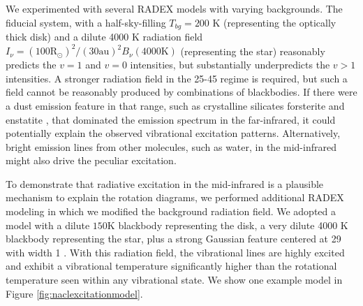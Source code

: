 \documentclass[twocolumn]{aastex62}
\begin{document}
We experimented with several RADEX models with varying backgrounds.  The
fiducial system, with a half-sky-filling $T_{bg}=200$ K (representing the
optically thick disk) and a dilute 4000 K radiation field $I_{\nu} = (100
\mathrm{R_\odot})^2 / (30 \mathrm{au})^2 B_\nu(4000 \mathrm{K})$ (representing
the star) reasonably predicts the $v=1$ and $v=0$ intensities, but
substantially underpredicts the $v>1$ intensities.  A stronger radiation
field in the 25-45 \um regime is required, but such a field cannot be
reasonably produced by combinations of blackbodies.  If there were a dust
emission feature in that range, such as crystalline silicates forsterite
and enstatite \citep[e.g.][]{Molster2005a}, that dominated the emission spectrum
in the far-infrared, it could potentially explain the observed vibrational
excitation patterns.  Alternatively, bright emission lines from other molecules,
such as water, in the mid-infrared might also drive the peculiar excitation.

To demonstrate that radiative excitation in the mid-infrared is a plausible
mechanism to explain the rotation diagrams, we performed additional RADEX
modeling in which we modified the background radiation field.  We adopted a
model with a dilute $150$K blackbody representing the disk, a very dilute 4000
K blackbody representing the star, plus a strong Gaussian feature centered at
29 \um with width 1 \um.  With this radiation field, the vibrational lines 
are highly excited and exhibit a vibrational temperature significantly higher
than the rotational temperature seen within any vibrational state.
We show one example model in Figure \ref{fig:naclexcitationmodel}.
\end{document}
